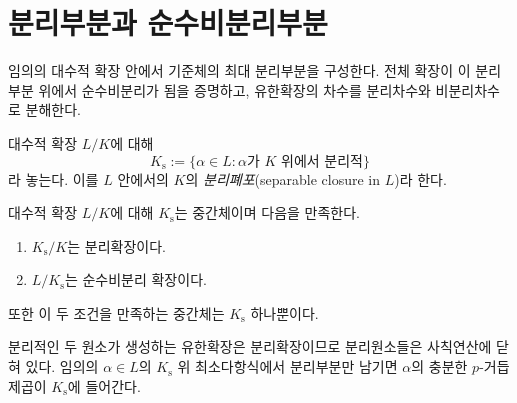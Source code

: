 \section{분리부분과 순수비분리부분}
\label{sec:separable-pure-decomposition}

\begin{learninggoal}
임의의 대수적 확장 안에서 기준체의 최대 분리부분을 구성한다. 전체 확장이 이 분리부분 위에서 순수비분리가 됨을 증명하고, 유한확장의 차수를 분리차수와 비분리차수로 분해한다.
\end{learninggoal}

\begin{definition}[확장 안의 분리폐포]
대수적 확장 $L/K$에 대해
\[
  K_{\mathrm s}
  :=\{\alpha\in L:\alpha\text{가 }K\text{ 위에서 분리적}\}
\]
라 놓는다. 이를 $L$ 안에서의 $K$의 \emph{분리폐포}(separable closure in $L$)라 한다.
\end{definition}

\begin{theorem}[분리-순수비분리 분해]
대수적 확장 $L/K$에 대해 $K_{\mathrm s}$는 중간체이며 다음을 만족한다.
\begin{enumerate}[label=(\roman*)]
  \item $K_{\mathrm s}/K$는 분리확장이다.
  \item $L/K_{\mathrm s}$는 순수비분리 확장이다.
\end{enumerate}
또한 이 두 조건을 만족하는 중간체는 $K_{\mathrm s}$ 하나뿐이다.
\end{theorem}

\begin{proofidea}
분리적인 두 원소가 생성하는 유한확장은 분리확장이므로 분리원소들은 사칙연산에 닫혀 있다. 임의의 $\alpha\in L$의 $K_{\mathrm s}$ 위 최소다항식에서 분리부분만 남기면 $\alpha$의 충분한 $p$-거듭제곱이 $K_{\mathrm s}$에 들어간다.
\end{proofidea}

